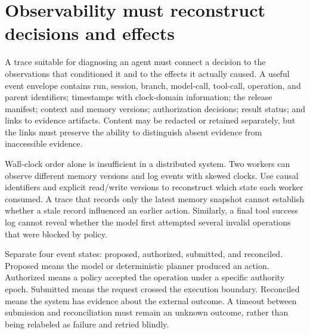 \section{Observability must reconstruct decisions and effects}\label{sec:C32:02}
A trace suitable for diagnosing an agent must connect a decision to the observations that conditioned it and to the effects it actually caused. A useful event envelope contains run, session, branch, model-call, tool-call, operation, and parent identifiers; timestamps with clock-domain information; the release manifest; context and memory versions; authorization decisions; result status; and links to evidence artifacts. Content may be redacted or retained separately, but the links must preserve the ability to distinguish absent evidence from inaccessible evidence.

Wall-clock order alone is insufficient in a distributed system. Two workers can observe different memory versions and log events with skewed clocks. Use causal identifiers and explicit read/write versions to reconstruct which state each worker consumed. A trace that records only the latest memory snapshot cannot establish whether a stale record influenced an earlier action. Similarly, a final tool success log cannot reveal whether the model first attempted several invalid operations that were blocked by policy.

Separate four event states: proposed, authorized, submitted, and reconciled. Proposed means the model or deterministic planner produced an action. Authorized means a policy accepted the operation under a specific authority epoch. Submitted means the request crossed the execution boundary. Reconciled means the system has evidence about the external outcome. A timeout between submission and reconciliation must remain an unknown outcome, rather than being relabeled as failure and retried blindly.

